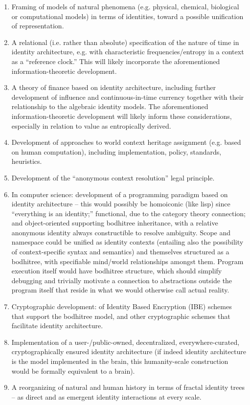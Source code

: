 \documentclass[pra,twocolumn,groupedaddress,10pt]{revtex4}
\theoremstyle{definition}
\begin{document}
\begin{enumerate}
	\item Framing of models of natural phenomena (e.g. physical, chemical, biological or computational models) in terms of identities, toward a possible unification of representation.
	\item A relational (i.e. rather than absolute) specification of the nature of time in identity architecture, e.g. with characteristic frequencies/entropy in a context as a ``reference clock.'' This will likely incorporate the aforementioned information-theoretic development.
	\item A theory of finance based on identity architecture, including further development of influence and continuous-in-time currency together with their relationship to the algebraic identity models. The aforementioned information-theoretic development will likely inform these considerations, especially in relation to value as entropically derived.
	\item Development of approaches to world context heritage assignment (e.g. based on human computation), including implementation, policy, standards, heuristics.
	\item Development of the ``anonymous context resolution'' legal principle.
	\item In computer science: development of a programming paradigm based on identity architecture -- this would possibly be homoiconic (like lisp) since ``everything is an identity;'' functional, due to the category theory connection; and object-oriented supporting bodhitree inheritance, with a relative anonymous identity always constructible to resolve ambiguity. Scope and namespace could be unified as identity contexts (entailing also the possibility of context-specific syntax and semantics) and themselves structured as a bodhitree, with specifiable mind/world relationships amongst them. Program execution itself would have bodhitree structure, which should simplify debugging and trivially motivate a connection to abstractions outside the program itself that reside in what we would otherwise call actual reality.
	\item Cryptographic development: of Identity Based Encryption (IBE) schemes that support the bodhitree model, and other cryptographic schemes that facilitate identity architecture.
	\item Implementation of a user-/public-owned, decentralized, everywhere-curated, cryptographically ensured identity architecture (if indeed identity architecture is the model implemented in the brain, this humanity-scale construction would be formally equivalent to a brain).
	\item A reorganizing of natural and human history in terms of fractal identity trees -- as direct and as emergent identity interactions at every scale.
\end{enumerate}
\end{document}
